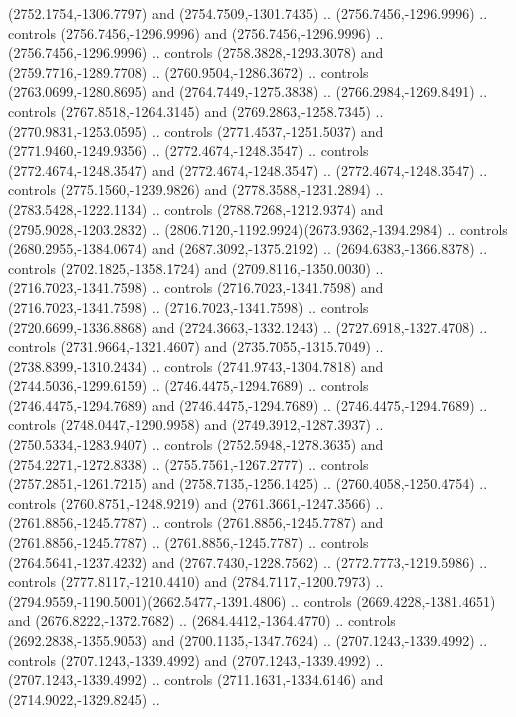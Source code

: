 \begin{scope}[shift={(28.3138,-376.6591)}]
\begin{scope}[shift={(-2186.6262,1813.8454)}]
      (2752.1754,-1306.7797) and (2754.7509,-1301.7435) .. (2756.7456,-1296.9996) ..
      controls (2756.7456,-1296.9996) and (2756.7456,-1296.9996) ..
      (2756.7456,-1296.9996) .. controls (2758.3828,-1293.3078) and
      (2759.7716,-1289.7708) .. (2760.9504,-1286.3672) .. controls
      (2763.0699,-1280.8695) and (2764.7449,-1275.3838) .. (2766.2984,-1269.8491) ..
      controls (2767.8518,-1264.3145) and (2769.2863,-1258.7345) ..
      (2770.9831,-1253.0595) .. controls (2771.4537,-1251.5037) and
      (2771.9460,-1249.9356) .. (2772.4674,-1248.3547) .. controls
      (2772.4674,-1248.3547) and (2772.4674,-1248.3547) .. (2772.4674,-1248.3547) ..
      controls (2775.1560,-1239.9826) and (2778.3588,-1231.2894) ..
      (2783.5428,-1222.1134) .. controls (2788.7268,-1212.9374) and
      (2795.9028,-1203.2832) .. (2806.7120,-1192.9924)(2673.9362,-1394.2984) ..
      controls (2680.2955,-1384.0674) and (2687.3092,-1375.2192) ..
      (2694.6383,-1366.8378) .. controls (2702.1825,-1358.1724) and
      (2709.8116,-1350.0030) .. (2716.7023,-1341.7598) .. controls
      (2716.7023,-1341.7598) and (2716.7023,-1341.7598) .. (2716.7023,-1341.7598) ..
      controls (2720.6699,-1336.8868) and (2724.3663,-1332.1243) ..
      (2727.6918,-1327.4708) .. controls (2731.9664,-1321.4607) and
      (2735.7055,-1315.7049) .. (2738.8399,-1310.2434) .. controls
      (2741.9743,-1304.7818) and (2744.5036,-1299.6159) .. (2746.4475,-1294.7689) ..
      controls (2746.4475,-1294.7689) and (2746.4475,-1294.7689) ..
      (2746.4475,-1294.7689) .. controls (2748.0447,-1290.9958) and
      (2749.3912,-1287.3937) .. (2750.5334,-1283.9407) .. controls
      (2752.5948,-1278.3635) and (2754.2271,-1272.8338) .. (2755.7561,-1267.2777) ..
      controls (2757.2851,-1261.7215) and (2758.7135,-1256.1425) ..
      (2760.4058,-1250.4754) .. controls (2760.8751,-1248.9219) and
      (2761.3661,-1247.3566) .. (2761.8856,-1245.7787) .. controls
      (2761.8856,-1245.7787) and (2761.8856,-1245.7787) .. (2761.8856,-1245.7787) ..
      controls (2764.5641,-1237.4232) and (2767.7430,-1228.7562) ..
      (2772.7773,-1219.5986) .. controls (2777.8117,-1210.4410) and
      (2784.7117,-1200.7973) .. (2794.9559,-1190.5001)(2662.5477,-1391.4806) ..
      controls (2669.4228,-1381.4651) and (2676.8222,-1372.7682) ..
      (2684.4412,-1364.4770) .. controls (2692.2838,-1355.9053) and
      (2700.1135,-1347.7624) .. (2707.1243,-1339.4992) .. controls
      (2707.1243,-1339.4992) and (2707.1243,-1339.4992) .. (2707.1243,-1339.4992) ..
      controls (2711.1631,-1334.6146) and (2714.9022,-1329.8245) ..

\end{scope}
\end{scope}
